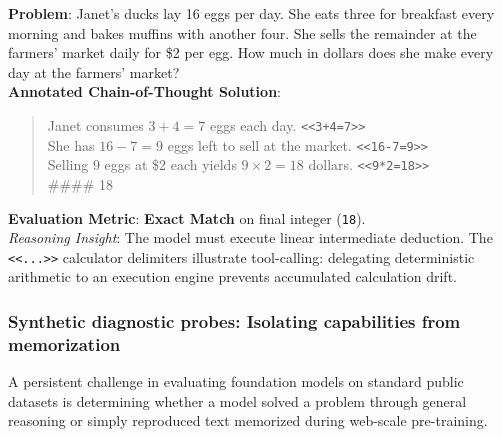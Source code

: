 \documentclass[../../../main.tex]{subfiles}
\begin{document}
\begin{center}
\begin{minipage}{0.95\textwidth}
\begin{tcolorbox}[colback=cardBg,colframe=cardLine,arc=2pt,boxrule=0.5pt,title=\textbf{Task Example: Multi-Step Mathematical Reasoning (GSM8K)}]
\small\sffamily
\textbf{Problem}: Janet’s ducks lay 16 eggs per day. She eats three for breakfast every morning and bakes muffins with another four. She sells the remainder at the farmers' market daily for \$2 per egg. How much in dollars does she make every day at the farmers' market? \\
\textbf{Annotated Chain-of-Thought Solution}:
\begin{quote}
Janet consumes $3 + 4 = 7$ eggs each day. \texttt{<<3+4=7>>} \\
She has $16 - 7 = 9$ eggs left to sell at the market. \texttt{<<16-7=9>>} \\
Selling 9 eggs at \$2 each yields $9 \times 2 = 18$ dollars. \texttt{<<9*2=18>>} \\
\#\#\#\# 18
\end{quote}
\textbf{Evaluation Metric}: \textbf{Exact Match} on final integer (\texttt{18}). \\
\textit{Reasoning Insight}: The model must execute linear intermediate deduction. The \texttt{<<...>>} calculator delimiters illustrate tool-calling: delegating deterministic arithmetic to an execution engine prevents accumulated calculation drift.
\end{tcolorbox}
\end{minipage}
\end{center}

\subsubsection{Synthetic diagnostic probes: Isolating capabilities from memorization}
\label{subsec:synthetic_probe_tasks}
A persistent challenge in evaluating foundation models on standard public datasets is determining whether a model solved a problem through general reasoning or simply reproduced text memorized during web-scale pre-training.
\end{document}
